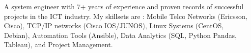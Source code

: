 

\begin{cvparagraph}

A system engineer with 7+ years of experience and proven records of successful projects in the ICT industry. My skillsets are : Mobile Telco Networks (Ericsson, Cisco), TCP/IP networks (Cisco IOS/JUNOS), Linux Systems (CentOS, Debian), Automation Tools (Ansible), Data Analytics (SQL, Python Pandas, Tableau), and Project Management. 
\end{cvparagraph}
